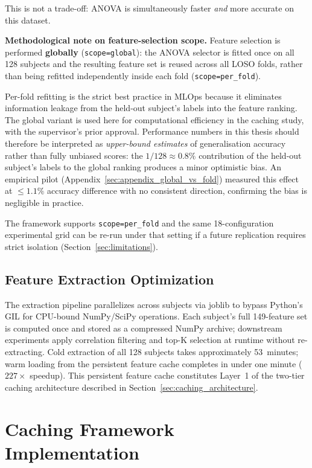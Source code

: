 This is not a trade-off: ANOVA is simultaneously faster \textit{and} more accurate on this dataset.

\textbf{Methodological note on feature-selection scope.}
Feature selection is performed \textbf{globally} (\texttt{scope=global}): the
ANOVA selector is fitted once on all 128 subjects and the resulting feature
set is reused across all LOSO folds, rather than being refitted independently
inside each fold (\texttt{scope=per\_fold}).

Per-fold refitting is the strict best practice in MLOps because it eliminates
information leakage from the held-out subject's labels into the feature
ranking. The global variant is used here for computational efficiency in the
caching study, with the supervisor's prior approval. Performance numbers in
this thesis should therefore be interpreted as \textit{upper-bound estimates}
of generalisation accuracy rather than fully unbiased scores: the $1/128
\approx 0.8\%$ contribution of the held-out subject's labels to the global
ranking produces a minor optimistic bias. An empirical pilot
(Appendix~\ref{sec:appendix_global_vs_fold}) measured this effect at
$\leq 1.1\%$ accuracy difference with no consistent direction, confirming
the bias is negligible in practice.

The framework supports \texttt{scope=per\_fold} and the same 18-configuration
experimental grid can be re-run under that setting if a future replication
requires strict isolation (Section~\ref{sec:limitations}).

\subsection{Feature Extraction Optimization}

The extraction pipeline parallelizes across subjects via joblib to bypass
Python's GIL for CPU-bound NumPy/SciPy operations. Each subject's full
149-feature set is computed once and stored as a compressed NumPy archive;
downstream experiments apply correlation filtering and top-K selection at
runtime without re-extracting. Cold extraction of all 128 subjects takes
approximately 53~minutes; warm loading from the persistent feature cache
completes in under one minute ($227\times$ speedup). This persistent
feature cache constitutes Layer~1 of the two-tier caching architecture
described in Section~\ref{sec:caching_architecture}.



\section{Caching Framework Implementation}
\label{sec:caching}


